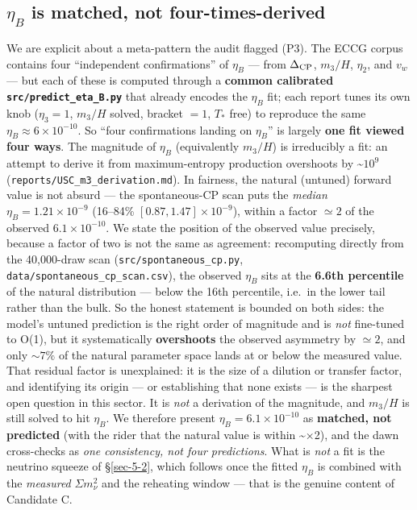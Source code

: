 \documentclass[aps,prd,preprint,nofootinbib,superscriptaddress]{revtex4-2}
\begin{document}
\subsection{\texorpdfstring{\(\eta_B\) is matched, not
four-times-derived}{ is matched, not four-times-derived}}\label{sec-5-4}

We are explicit about a meta-pattern the audit flagged (P3). The ECCG
corpus contains four ``independent confirmations'' of \(\eta_B\) ---
from \(\Delta_{\rm CP}\), \(m_3/H\), \(\eta_2\), and \(v_w\) --- but
each of these is computed through a \textbf{common calibrated
\texttt{src/\allowbreak predict\_\allowbreak eta\_\allowbreak B.\allowbreak py}} that already encodes the \(\eta_B\)
fit; each report tunes its own knob (\(\eta_3 = 1\), \(m_3/H\) solved,
bracket \(= 1\), \(T_*\) free) to reproduce the same
\(\eta_B \approx 6\times10^{-10}\). So ``four confirmations landing on
\(\eta_B\)'' is largely \textbf{one fit viewed four ways}. The magnitude
of \(\eta_B\) (equivalently \(m_3/H\)) is irreducibly a fit: an attempt
to derive it from maximum-entropy production overshoots by
\textasciitilde{}\(10^{9}\) (\texttt{reports/\allowbreak USC\_\allowbreak m3\_\allowbreak derivation.\allowbreak md}).
In fairness, the natural (untuned) forward value is not absurd --- the
spontaneous-CP scan puts the \emph{median}
\(\eta_B = 1.21\times10^{-9}\) (16--84\% \([0.87, 1.47]\times10^{-9}\)),
within a factor \(\simeq 2\) of the observed \(6.1\times10^{-10}\). We
state the position of the observed value precisely, because a factor of
two is not the same as agreement: recomputing directly from the
40,000-draw scan (\texttt{src/\allowbreak spontaneous\_\allowbreak cp.\allowbreak py},
\texttt{data/\allowbreak spontaneous\_\allowbreak cp\_\allowbreak scan.\allowbreak csv}), the observed \(\eta_B\) sits
at the \textbf{6.6th percentile} of the natural distribution --- below
the 16th percentile, i.e.~in the lower tail rather than the bulk. So the
honest statement is bounded on both sides: the model's untuned
prediction is the right order of magnitude and is \emph{not} fine-tuned
to O(1), but it systematically \textbf{overshoots} the observed
asymmetry by \(\simeq 2\), and only \(\sim 7\%\) of the natural
parameter space lands at or below the measured value. That residual
factor is unexplained: it is the size of a dilution or transfer factor,
and identifying its origin --- or establishing that none exists --- is
the sharpest open question in this sector. It is \emph{not} a derivation
of the magnitude, and \(m_3/H\) is still solved to hit \(\eta_B\). We
therefore present \(\eta_B = 6.1\times10^{-10}\) as \textbf{matched, not
predicted} (with the rider that the natural value is within
\textasciitilde×2), and the dawn cross-checks as \emph{one consistency,
not four predictions}. What is \emph{not} a fit is the neutrino squeeze
of §\ref{sec-5-2}, which follows once the fitted \(\eta_B\) is combined
with the \emph{measured} \(\Sigma m_\nu^{2}\) and the reheating window
--- that is the genuine content of Candidate C.
\end{document}
